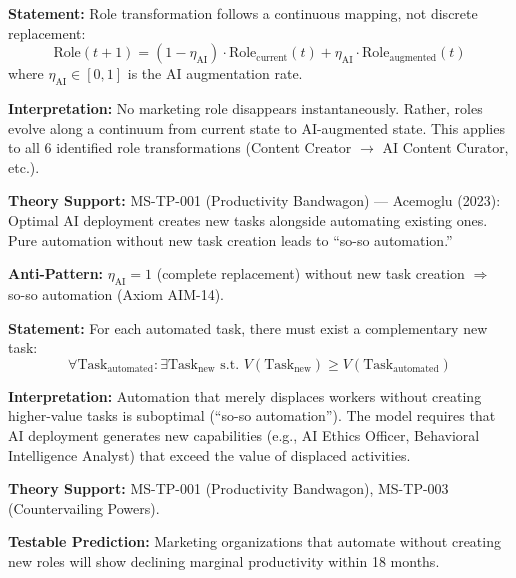 \begin{tcolorbox}[colback=gray!5!white, colframe=gray!75!black,
    title=Axiom AIM-13: Role Transformation Continuity]
\label{ax:aim-13}

\textbf{Statement:}
Role transformation follows a continuous mapping, not discrete replacement:
\begin{equation}
\text{Role}(t+1) = (1 - \eta_{\text{AI}}) \cdot \text{Role}_{\text{current}}(t) + \eta_{\text{AI}} \cdot \text{Role}_{\text{augmented}}(t)
\label{eq:aim-role-transformation}
\end{equation}
where $\eta_{\text{AI}} \in [0,1]$ is the AI augmentation rate.

\textbf{Interpretation:} No marketing role disappears instantaneously.
Rather, roles evolve along a continuum from current state to AI-augmented
state. This applies to all 6 identified role transformations
(Content Creator $\to$ AI Content Curator, etc.).

\textbf{Theory Support:} MS-TP-001 (Productivity Bandwagon) --- Acemoglu (2023):
Optimal AI deployment creates new tasks alongside automating existing ones.
Pure automation without new task creation leads to ``so-so automation.''

\textbf{Anti-Pattern:} $\eta_{\text{AI}} = 1$ (complete replacement) without
new task creation $\Rightarrow$ so-so automation (Axiom AIM-14).
\end{tcolorbox}


\begin{tcolorbox}[colback=gray!5!white, colframe=gray!75!black,
    title=Axiom AIM-14: So-So Automation Avoidance]
\label{ax:aim-14}

\textbf{Statement:}
For each automated task, there must exist a complementary new task:
\begin{equation}
\forall \text{Task}_{\text{automated}}: \exists \text{Task}_{\text{new}} \text{ s.t. } V(\text{Task}_{\text{new}}) \geq V(\text{Task}_{\text{automated}})
\label{eq:aim-so-so}
\end{equation}

\textbf{Interpretation:} Automation that merely displaces workers without
creating higher-value tasks is suboptimal (``so-so automation''). The model
requires that AI deployment generates new capabilities (e.g., AI Ethics
Officer, Behavioral Intelligence Analyst) that exceed the value of
displaced activities.

\textbf{Theory Support:} MS-TP-001 (Productivity Bandwagon),
MS-TP-003 (Countervailing Powers).

\textbf{Testable Prediction:} Marketing organizations that automate without
creating new roles will show declining marginal productivity within 18 months.
\end{tcolorbox}


